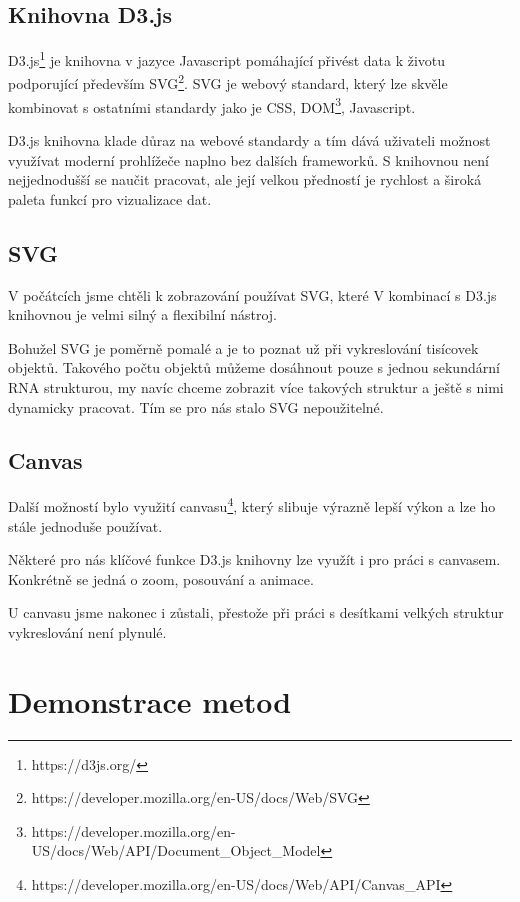 \subsection{Knihovna D3.js}

D3.js\footnote{https://d3js.org/} je knihovna v jazyce Javascript pomáhající
přivést data k životu podporující především
SVG\footnote{https://developer.mozilla.org/en-US/docs/Web/SVG}. SVG je webový
standard, který lze skvěle kombinovat s ostatními standardy jako je CSS,
DOM\footnote{https://developer.mozilla.org/en-US/docs/Web/API/Document\_Object\_Model},
Javascript.

D3.js knihovna klade důraz na webové standardy a tím dává uživateli možnost
využívat moderní prohlížeče naplno bez dalších frameworků. S knihovnou není
nejjednodušší se naučit pracovat, ale její velkou předností je rychlost a
široká paleta funkcí pro vizualizace dat.

\subsection{SVG}

V počátcích jsme chtěli k zobrazování používat SVG, které V kombinací s D3.js
knihovnou je velmi silný a flexibilní nástroj.

Bohužel SVG je poměrně pomalé a je to poznat už při vykreslování tisícovek
objektů. Takového počtu objektů můžeme dosáhnout pouze s jednou sekundární RNA
strukturou, my navíc chceme zobrazit více takových struktur a ještě s nimi
dynamicky pracovat. Tím se pro nás stalo SVG nepoužitelné.

\subsection{Canvas}

Další možností bylo využití
canvasu\footnote{https://developer.mozilla.org/en-US/docs/Web/API/Canvas\_API},
který slibuje výrazně lepší výkon a lze ho stále jednoduše používat.

Některé pro nás klíčové funkce D3.js knihovny lze využít i pro práci s
canvasem. Konkrétně se jedná o zoom, posouvání a animace.

U canvasu jsme nakonec i zůstali, přestože při práci s desítkami velkých
struktur vykreslování není plynulé.

\section{Demonstrace metod}


